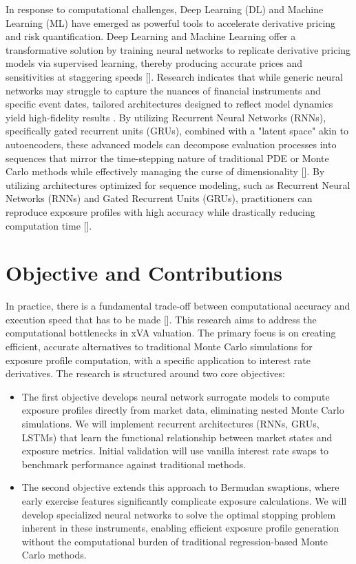 \noindent
     In response to computational challenges, Deep Learning (DL) and Machine Learning (ML) have emerged as powerful tools to accelerate derivative pricing and risk quantification. Deep Learning and Machine Learning offer a transformative solution by training neural networks to replicate derivative pricing models via supervised learning, thereby producing accurate prices and sensitivities at staggering speeds [\cite{Murex_Derivatives_Pricing_NN}]. Research indicates that while generic neural networks may struggle to capture the nuances of financial instruments and specific event dates, tailored architectures designed to reflect model dynamics yield high-fidelity results \cite{Murex_Derivatives_Pricing_NN}. By utilizing Recurrent Neural Networks (RNNs), specifically gated recurrent units (GRUs), combined with a "latent space" akin to autoencoders, these advanced models can decompose evaluation processes into sequences that mirror the time-stepping nature of traditional PDE or Monte Carlo methods while effectively managing the curse of dimensionality [\cite{beck2020overview}]. By utilizing architectures optimized for sequence modeling, such as Recurrent Neural Networks (RNNs) and Gated Recurrent Units (GRUs), practitioners can reproduce exposure profiles with high accuracy while drastically reducing computation time [\cite{frode2022neural}].

\noindent
\chapter{Objective and Contributions}

    In practice, there is a fundamental trade-off between computational accuracy and execution speed that has to be made [\cite{Tsuchiya_2019}]. This research aims to address the computational bottlenecks in xVA valuation. The primary focus is on creating efficient, accurate alternatives to traditional Monte Carlo simulations for exposure profile computation, with a specific application to interest rate derivatives. The research is structured around two core objectives: \\
                
    \noindent
    \begin{itemize}
        \item The first objective develops neural network surrogate models to compute exposure profiles directly from market data, eliminating nested Monte Carlo simulations. We will implement recurrent architectures (RNNs, GRUs, LSTMs) that learn the functional relationship between market states and exposure metrics. Initial validation will use vanilla interest rate swaps to benchmark performance against traditional methods.
    
        \item The second objective extends this approach to Bermudan swaptions, where early exercise features significantly complicate exposure calculations. We will develop specialized neural networks to solve the optimal stopping problem inherent in these instruments, enabling efficient exposure profile generation without the computational burden of traditional regression-based Monte Carlo methods.
    \end{itemize}


